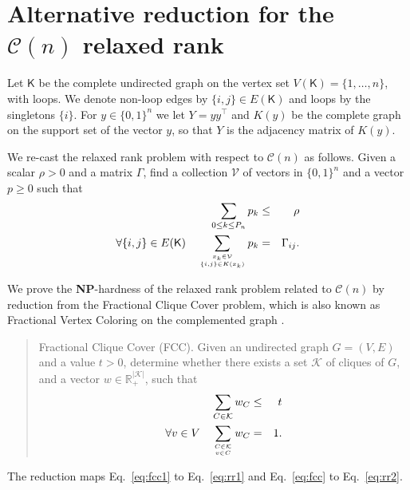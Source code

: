\documentclass[envcountsect,envcountsame]{svjour3}
\theoremstyle{changebreak}                %
\newcommand{\transpose}[1]{{#1}^{\top}}
\newcommand{\CONX}[1]{\mathcal{C}(#1)}
\begin{document}
\section{Alternative reduction for the $\CONX{n}$ relaxed rank}
\label{a:rrank}
Let $\mathsf{K}$ be the complete undirected graph on the vertex set $V(\mathsf{K})=\{1,\ldots,n\}$, with loops. We denote non-loop edges by $\{i,j\}\in E(\mathsf{K})$ and loops by the singletons $\{i\}$. For $y\in\{0,1\}^n$ we let $Y=y\transpose{y}$ and $K(y)$ be the complete graph on the support set of the vector $y$, so that $Y$ is the adjacency matrix of $K(y)$. 

We re-cast the relaxed rank problem with respect to $\CONX{n}$ as follows. Given a scalar $\rho>0$ and a matrix $\Gamma$, find a collection $\mathcal{V}$ of vectors in $\{0,1\}^n$ and a vector $p\ge 0$ such that
\begin{eqnarray}
\sum\limits_{0\le k\le P_n} p_k &\le& \rho \label{eq:rr1} \\
\forall\{i,j\}\in E(\mathsf{K})\quad \sum\limits_{x_k\in\mathcal{V} \atop \{i,j\}\in K(x_k)} p_k &=&\Gamma_{ij}. \label{eq:rr2}
\end{eqnarray}

We prove the \textbf{NP}-hardness of the relaxed rank problem related to $\CONX{n}$ by reduction from the {\sc Fractional Clique Cover} problem, which is also known as {\sc Fractional Vertex Coloring} on the complemented graph \cite{lundyann}. 
\begin{quote}
  {\sc Fractional Clique Cover} (FCC). Given an undirected graph $G=(V,E)$ and a value $t>0$, determine whether there exists a set $\mathcal{K}$ of cliques of $G$, and a vector $w\in\mathbb{R}^{|\mathcal{K}|}_+$, such that
 \begin{eqnarray}
 \sum\limits_{C\in\mathcal{K}}w_{C} &\le& t \label{eq:fcc1} \\
  \forall v\in V\quad \sum\limits_{C\in\mathcal{K}\atop v\in C} w_C &=& 1. \label{eq:fcc}
 \end{eqnarray}
\end{quote}
The reduction maps Eq.~\eqref{eq:fcc1} to Eq.~\eqref{eq:rr1} and Eq.~\eqref{eq:fcc} to Eq.~\eqref{eq:rr2}.
\end{document}
